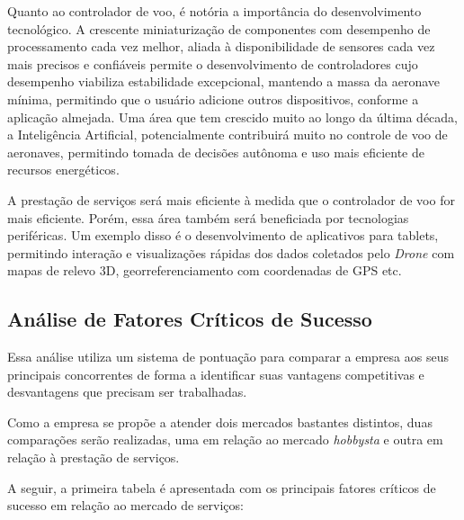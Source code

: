 Quanto ao controlador de voo, é notória a importância do desenvolvimento tecnológico. A crescente 
miniaturização de componentes com desempenho de processamento cada vez melhor, aliada à disponibilidade 
de sensores cada vez mais precisos e confiáveis permite o desenvolvimento de controladores cujo desempenho 
viabiliza estabilidade excepcional, mantendo a massa da aeronave mínima, permitindo que o usuário adicione 
outros dispositivos, conforme a aplicação almejada. Uma área que tem crescido muito ao longo da última década, 
a Inteligência Artificial, potencialmente contribuirá muito no controle de voo de aeronaves, permitindo 
tomada de decisões autônoma e uso mais eficiente de recursos energéticos.

A prestação de serviços será mais eficiente à medida que o controlador de voo for mais eficiente. Porém, 
essa área também será beneficiada por tecnologias periféricas. Um exemplo disso é o desenvolvimento de 
aplicativos para tablets, permitindo interação e visualizações rápidas dos dados coletados pelo \emph{Drone} com 
mapas de relevo 3D, georreferenciamento com coordenadas de GPS etc.

\subsection{Análise de Fatores Críticos de Sucesso}

Essa análise utiliza um sistema de pontuação para comparar a empresa aos seus principais concorrentes de 
forma a identificar suas vantagens competitivas e desvantagens que precisam ser trabalhadas.

Como a empresa se propõe a atender dois mercados bastantes distintos, duas comparações serão realizadas, 
uma em relação ao mercado \emph{hobbysta} e outra em relação à prestação de serviços.

A seguir, a primeira tabela é apresentada com os principais fatores críticos de sucesso em relação ao 
mercado de serviços:

